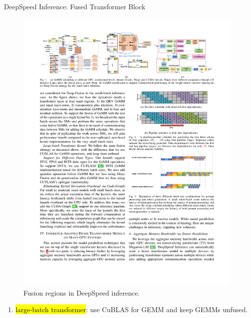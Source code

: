 \begin{frame}{DeepSpeed Inference: Fused Transformer Block}
    \begin{figure}
        \includegraphics[width=0.85\linewidth]{./images/fused_transformer_block-deepspeed-inference.pdf}
        \caption{Fusion regions in DeepSpeed inference.}
    \end{figure}
    \footnotesize{
    \begin{enumerate}
        \item[] \hl{large-batch transformer}: use CuBLAS for GEMM and keep GEMMs unfused.
    \end{enumerate}
    }
\end{frame}

